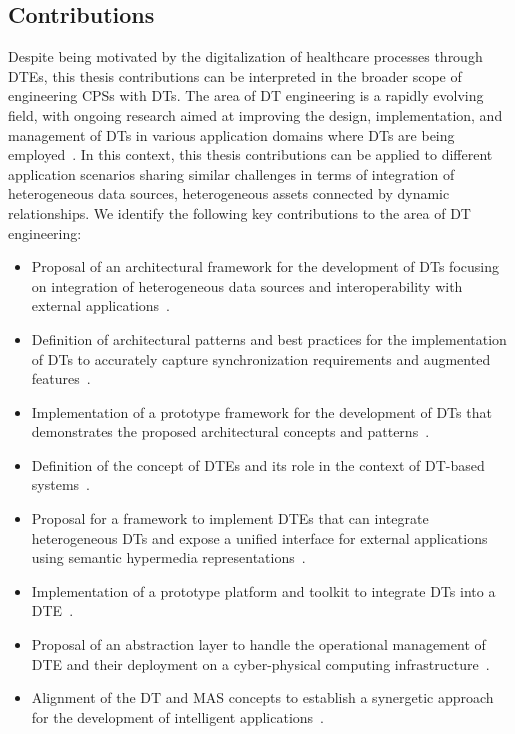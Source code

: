\subsection*{Contributions}

Despite being motivated by the digitalization of healthcare processes through \acp{DTE}, this thesis contributions can be interpreted in the broader scope of engineering \acp{CPS} with \acp{DT}.
%
The area of \ac{DT} engineering is a rapidly evolving field, with ongoing research aimed at improving the design, implementation, and management of \acp{DT} in various application domains where \acp{DT} are being employed~\cite{Mihai_survey_enabling_2022}.
%
In this context, this thesis contributions can be applied to different application scenarios sharing similar challenges in terms of integration of heterogeneous data sources, heterogeneous assets connected by dynamic relationships.
We identify the following key contributions to the area of \ac{DT} engineering:
\begin{itemize}
  \item Proposal of an architectural framework for the development of \acp{DT} focusing on integration of heterogeneous data sources and interoperability with external applications~\missingref{}.
  \item Definition of architectural patterns and best practices for the implementation of \acp{DT} to accurately capture synchronization requirements and augmented features~\missingref{}.
  \item Implementation of a prototype framework for the development of \acp{DT} that demonstrates the proposed architectural concepts and patterns~\missingref{}.
  \item Definition of the concept of \acp{DTE} and its role in the context of \ac{DT}-based systems~\missingref{}.
  \item Proposal for a framework to implement \acp{DTE} that can integrate heterogeneous \acp{DT} and expose a unified interface for external applications using semantic hypermedia representations~\missingref{}.
  \item Implementation of a prototype platform and toolkit to integrate \acp{DT} into a \ac{DTE}~\missingref{}.
  \item Proposal of an abstraction layer to handle the operational management of \ac{DTE} and their deployment on a cyber-physical computing infrastructure~\missingref{}.
  \item Alignment of the \ac{DT} and \ac{MAS} concepts to establish a synergetic approach for the development of intelligent applications~\missingref{}.
\end{itemize}

